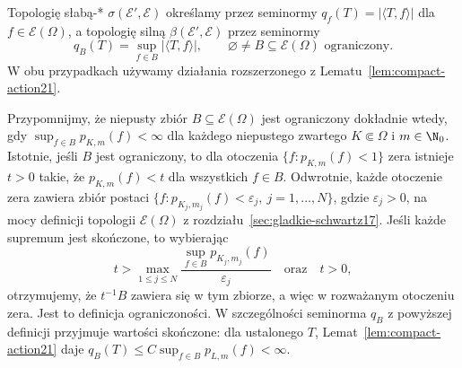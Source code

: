 \begin{definicja}
\label{def:dt-Eprime-topologies}
Topologię słabą-* $\sigma(\mathcal E',\mathcal E)$
określamy przez seminormy
$q_f(T)=|\langle T,f\rangle|$ dla $f\in\mathcal E(\Omega)$,
a topologię silną $\beta(\mathcal E',\mathcal E)$ przez
seminormy
\[
 q_B(T)=\sup_{f\in B}|\langle T,f\rangle|,
 \qquad \varnothing\ne B\subseteq\mathcal E(\Omega)
 \text{ ograniczony}.
\]
W obu przypadkach używamy działania rozszerzonego
z Lematu~\ref{lem:compact-action21}.
\end{definicja}

Przypomnijmy, że niepusty zbiór $B\subseteq\mathcal E(\Omega)$
jest ograniczony dokładnie wtedy, gdy
$\sup_{f\in B}p_{K,m}(f)<\infty$ dla każdego
niepustego zwartego $K\Subset\Omega$ i $m\in\N_0$.
Istotnie, jeśli $B$ jest ograniczony, to dla otoczenia
$\{f:p_{K,m}(f)<1\}$ zera istnieje $t>0$ takie,
że $p_{K,m}(f)<t$ dla wszystkich $f\in B$.
Odwrotnie, każde otoczenie zera zawiera zbiór postaci
$\{f:p_{K_j,m_j}(f)<\varepsilon_j,\ j=1,\ldots,N\}$,
gdzie $\varepsilon_j>0$, na mocy definicji topologii
$\mathcal E(\Omega)$ z rozdziału~\ref{sec:gladkie-schwartz17}.
Jeśli każde supremum jest skończone, to wybierając
\[
 t> \max_{1\le j\le N}
 \frac{\sup_{f\in B}p_{K_j,m_j}(f)}{\varepsilon_j}
 \quad\text{oraz}\quad t>0,
\]
otrzymujemy, że $t^{-1}B$ zawiera się w tym zbiorze,
a więc w rozważanym otoczeniu zera.
Jest to definicja ograniczoności.
W szczególności seminorma $q_B$ z powyższej definicji
przyjmuje wartości skończone: dla ustalonego $T$,
Lemat~\ref{lem:compact-action21} daje
$q_B(T)\le C\sup_{f\in B}p_{L,m}(f)<\infty$.


